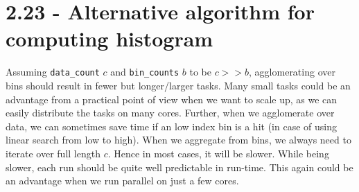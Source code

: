 \documentclass[a4paper,11pt,twoside]{article}
\begin{document}
\section{2.23 - Alternative algorithm for computing histogram}
Assuming \verb+data_count+ $c$ and \verb+bin_counts+ $b$ to be $c >> b$, agglomerating over bins should result in fewer but longer/larger tasks. Many small tasks could be an advantage from a practical point of view when we want to scale up, as we can easily distribute the tasks on many cores. Further, when we agglomerate over data, we can sometimes save time if an low index bin is a hit (in case of using linear search from low to high). When we aggregate from bins, we always need to iterate over full length $c$. Hence in most cases, it will be slower. While being slower, each run should be quite well predictable in run-time. This again could be an advantage when we run parallel on just a few cores. 


\end{document}
